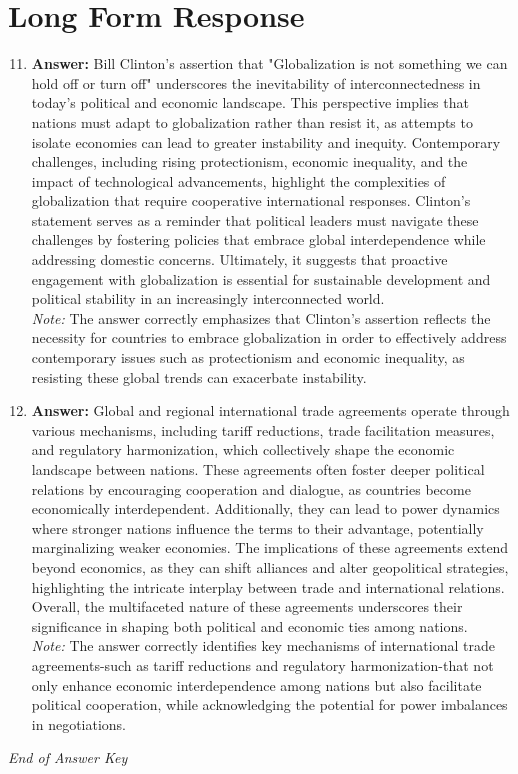 \documentclass[12pt]{article}
\begin{document}
\section*{Long Form Response}
\begin{enumerate}[label=\arabic*.]
\setcounter{enumi}{10}
\item \textbf{Answer:} Bill Clinton's assertion that "Globalization is not something we can hold off or turn off" underscores the inevitability of interconnectedness in today's political and economic landscape. This perspective implies that nations must adapt to globalization rather than resist it, as attempts to isolate economies can lead to greater instability and inequity. Contemporary challenges, including rising protectionism, economic inequality, and the impact of technological advancements, highlight the complexities of globalization that require cooperative international responses. Clinton's statement serves as a reminder that political leaders must navigate these challenges by fostering policies that embrace global interdependence while addressing domestic concerns. Ultimately, it suggests that proactive engagement with globalization is essential for sustainable development and political stability in an increasingly interconnected world.
\\ \textit{Note:} The answer correctly emphasizes that Clinton's assertion reflects the necessity for countries to embrace globalization in order to effectively address contemporary issues such as protectionism and economic inequality, as resisting these global trends can exacerbate instability.
\item \textbf{Answer:} Global and regional international trade agreements operate through various mechanisms, including tariff reductions, trade facilitation measures, and regulatory harmonization, which collectively shape the economic landscape between nations. These agreements often foster deeper political relations by encouraging cooperation and dialogue, as countries become economically interdependent. Additionally, they can lead to power dynamics where stronger nations influence the terms to their advantage, potentially marginalizing weaker economies. The implications of these agreements extend beyond economics, as they can shift alliances and alter geopolitical strategies, highlighting the intricate interplay between trade and international relations. Overall, the multifaceted nature of these agreements underscores their significance in shaping both political and economic ties among nations.
\\ \textit{Note:} The answer correctly identifies key mechanisms of international trade agreements-such as tariff reductions and regulatory harmonization-that not only enhance economic interdependence among nations but also facilitate political cooperation, while acknowledging the potential for power imbalances in negotiations.
\end{enumerate}

\vfill
\noindent\textit{End of Answer Key}
\end{document}
